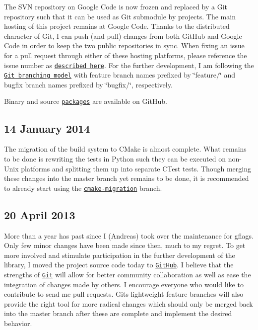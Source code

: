 The S\+VN repository on Google Code is now frozen and replaced by a Git repository such that it can be used as Git submodule by projects. The main hosting of this project remains at Google Code. Thanks to the distributed character of Git, I can push (and pull) changes from both Git\+Hub and Google Code in order to keep the two public repositories in sync. When fixing an issue for a pull request through either of these hosting platforms, please reference the issue number as \href{https://code.google.com/p/support/wiki/IssueTracker#Integration_with_version_control}{\tt described here}. For the further development, I am following the \href{http://nvie.com/posts/a-successful-git-branching-model/}{\tt Git branching model} with feature branch names prefixed by \char`\"{}feature/\char`\"{} and bugfix branch names prefixed by \char`\"{}bugfix/\char`\"{}, respectively.

Binary and source \href{https://github.com/schuhschuh/gflags/releases}{\tt packages} are available on Git\+Hub.

\subsection*{14 January 2014 }

The migration of the build system to C\+Make is almost complete. What remains to be done is rewriting the tests in Python such they can be executed on non-\/\+Unix platforms and splitting them up into separate C\+Test tests. Though merging these changes into the master branch yet remains to be done, it is recommended to already start using the \href{https://github.com/schuhschuh/gflags/tree/cmake-migration}{\tt cmake-\/migration} branch.

\subsection*{20 April 2013 }

More than a year has past since I (Andreas) took over the maintenance for {\ttfamily gflags}. Only few minor changes have been made since then, much to my regret. To get more involved and stimulate participation in the further development of the library, I moved the project source code today to \href{https://github.com/schuhschuh/gflags}{\tt Git\+Hub}. I believe that the strengths of \href{http://git-scm.com/}{\tt Git} will allow for better community collaboration as well as ease the integration of changes made by others. I encourage everyone who would like to contribute to send me pull requests. Git\textquotesingle{}s lightweight feature branches will also provide the right tool for more radical changes which should only be merged back into the master branch after these are complete and implement the desired behavior.

